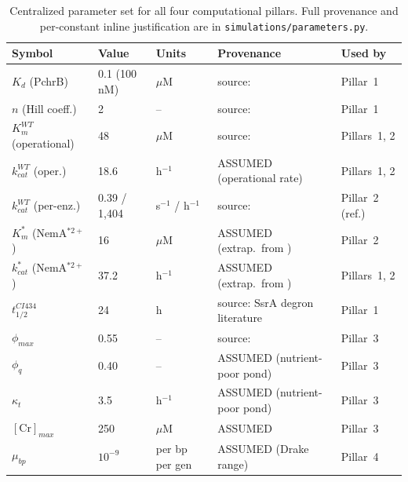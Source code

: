 \documentclass[10pt,twocolumn,letterpaper,
              colorlinks=true,
              linkcolor=blue!70!black,
              citecolor=blue!70!black,
              urlcolor=blue!70!black,
              pdfborder={0 0 0}]{article}
\begin{document}
\begin{table}[!t]
\centering
\caption{Centralized parameter set for all four computational pillars.
  Full provenance and per-constant inline justification are in
  \texttt{simulations/parameters.py}.}
\label{tab:params}
\small
\begin{tabular}{@{}lllll@{}}
\toprule
\textbf{Symbol} & \textbf{Value} & \textbf{Units} &
\textbf{Provenance} & \textbf{Used by} \\
\midrule
$K_d$ (PchrB)            & 0.1 (100 nM)       & $\mu$M              & source: \cite{igem2013}                      & Pillar~1 \\
$n$ (Hill coeff.)         & 2                  & --                 & source: \cite{igem2013}                      & Pillar~1 \\
$K_m^{WT}$ (operational)  & 48                 & $\mu$M              & source: \cite{williams2003}                  & Pillars~1, 2 \\
$k_{cat}^{WT}$ (oper.)    & 18.6               & h$^{-1}$            & ASSUMED (operational rate)                   & Pillars~1, 2 \\
$k_{cat}^{WT}$ (per-enz.) & 0.39 / 1{,}404    & s$^{-1}$ / h$^{-1}$& source: \cite{williams2003}                  & Pillar~2 (ref.) \\
$K_m^{*}$ (NemA$^{*2+}$) & 16                 & $\mu$M              & ASSUMED (extrap.\ from \cite{mowafy2010})    & Pillar~2 \\
$k_{cat}^{*}$ (NemA$^{*2+}$) & 37.2           & h$^{-1}$            & ASSUMED (extrap.\ from \cite{mowafy2010})    & Pillars~1, 2 \\
$t_{1/2}^{CI434}$         & 24                 & h                   & source: SsrA degron literature               & Pillar~1 \\
$\phi_{max}$              & 0.55               & --                 & source: \cite{scott2010}                     & Pillar~3 \\
$\phi_q$                  & 0.40               & --                 & ASSUMED (nutrient-poor pond)                 & Pillar~3 \\
$\kappa_t$                & 3.5                & h$^{-1}$            & ASSUMED (nutrient-poor pond)                 & Pillar~3 \\
$[\text{Cr}]_{max}$       & 250                & $\mu$M              & ASSUMED                                      & Pillar~3 \\
$\mu_{bp}$                & $10^{-9}$          & per bp per gen      & ASSUMED (Drake \cite{drake1991} range)       & Pillar~4 \\

\end{tabular}
\end{table}
\end{document}
